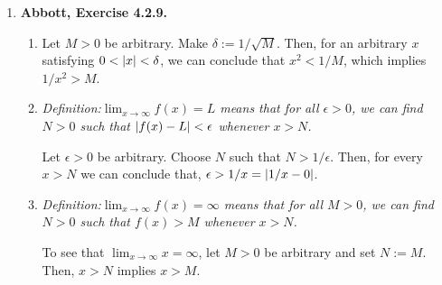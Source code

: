 \documentclass{article}
\DeclarePairedDelimiter\abs{\lvert}{\rvert}
\DeclarePairedDelimiter\floor{\lfloor}{\rfloor}
\newcommand{\exc}[2][Abbott]{\item \textbf{#1, Exercise #2.}}
\newcommand{\lep}[1][L]{#1et $\epsilon > 0$ be arbitrary}
\begin{document}
\begin{enumerate}
\begin{enumerate}
        \item We claim that the limit is $-1$. To see that, \lep[l]. Choose $\delta = 1/4$ and pick an arbitrary $x$ satisfying $0 < \abs{x-7/4} < \delta$. It follows that $x-2 < 0$, therefore $\abs{x-2}/(x-2) = -(x-2)/(x-2) = -1$. Then,
        \begin{equation*}
            \abs*{\frac{\abs{x-2}}{x-2} - (-1)} = \abs*{-1 + 1} = 0 < \epsilon.
        \end{equation*}
        
        \item The limit does not exist.  Let $f(x) = (-1)^{\floor*{1/x}}$ and consider the sequences $(a_n) = (1/(2n))$ and $(b_n) = (1/(2n+1))$. Both of them converge to $0$ and none of their terms are equal to $0$. Notice that $\lim f(a_n) =
        \lim (-1)^{2n} = 1$, whereas $\lim f(b_n) = -1$. By Corollary 4.2.5, the limit does not exist.
        
        \item We claim that the limit is $0$. To see that, \lep[l]. Choose $\delta = \epsilon^3$. Then, for an arbitrary $x$ satisfying $0 < \abs{x} < \delta$, we can conclude that $\abs{\sqrt[3]{x}} < \epsilon$.
    \end{enumerate}
    
    \exc{4.2.9}
    \begin{enumerate}
        \item Let $M > 0$ be arbitrary. Make $\delta := 1/\sqrt{M}$. Then, for an arbitrary $x$ satisfying $0 < \abs{x} < \delta$, we can conclude that $x^2 <1/M$, which implies $1/x^2 > M$.
        
        \item \em{Definition:}\em \space $\lim_{x \to \infty} f(x) = L$ means that for all $\epsilon > 0$, we can find $N > 0$ such that $\abs*{f(x) - L} < \epsilon$ whenever $x > N$.
        
        \lep. Choose $N$ such that $N > 1/\epsilon$. Then, for every $x > N$ we can conclude that, $\epsilon > 1/x = \abs{1/x-0}$.
        
        \item \em{Definition:}\em \space $\lim_{x \to \infty} f(x) = \infty$ means that for all $M > 0$, we can find $N > 0$ such that $f(x) > M$ whenever $x > N$.
        
        To see that $\lim_{x \to \infty} x = \infty$, let $M > 0$ be arbitrary and set $N := M$. Then, $x > N$ implies $x > M$.
    \end{enumerate}
    

\end{enumerate}
\end{document}
